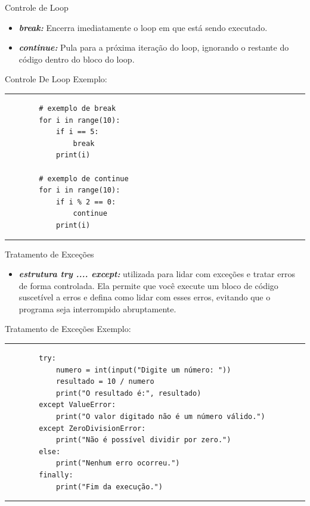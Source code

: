 \documentclass{beamer}
\begin{document}
\begin{frame}[fragile]{Controle de Loop}
	\begin{itemize}
		\item  \textbf{\textit{break:}} Encerra imediatamente o loop em que está sendo executado.
		\item \textbf{\textit{continue:}} Pula para a próxima iteração do loop, ignorando o restante do código dentro do bloco do loop.
	\end{itemize}
\end{frame}

\begin{frame}[fragile]{Controle De Loop}
	Exemplo:
	\rule{\textwidth}{1pt}
	\scriptsize
	\begin{verbatim}
		# exemplo de break
		for i in range(10):
			if i == 5:
				break
			print(i)
		
		# exemplo de continue
		for i in range(10):
			if i % 2 == 0:
				continue
			print(i)

	\end{verbatim}
	\rule{\textwidth}{1pt}
	
\end{frame}

\begin{frame}[fragile]{Tratamento de Exceções}
	\begin{itemize}
		\item  \textbf{\textit{estrutura try .... except:}} utilizada para lidar com exceções e tratar erros de forma controlada. Ela permite que você execute um bloco de código suscetível a erros e defina como lidar com esses erros, evitando que o programa seja interrompido abruptamente. 
	\end{itemize}
\end{frame}

\begin{frame}[fragile]{Tratamento de Exceções}
	Exemplo:
	\rule{\textwidth}{1pt}
	\scriptsize
	\begin{verbatim}
		try:
			numero = int(input("Digite um número: "))
			resultado = 10 / numero
			print("O resultado é:", resultado)
		except ValueError:
			print("O valor digitado não é um número válido.")
		except ZeroDivisionError:
			print("Não é possível dividir por zero.")
		else:
			print("Nenhum erro ocorreu.")
		finally:
			print("Fim da execução.")		
	\end{verbatim}
	\rule{\textwidth}{1pt}
\end{frame}
\end{document}
